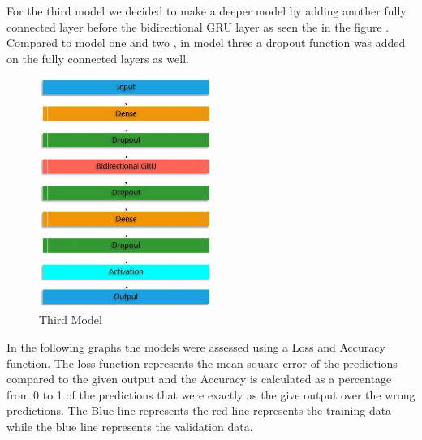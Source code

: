 For the third model we decided to make a deeper model by adding another fully connected layer before the bidirectional GRU layer as seen the in the figure . Compared to model one and two , in model three a dropout function was added on the fully connected layers as well.
\begin{figure}[htp]
	\centering
	\includegraphics[width=0.5\textwidth]{Illustrations/Model3.jpg}
	\caption{Third Model}
	\label{fig:thirdModel}
\end{figure}




In the following graphs the models were assessed using a Loss and Accuracy function. The loss function represents the mean square error of the predictions compared to the given output and the Accuracy is calculated as a percentage from 0 to 1 of the predictions that were exactly as the give output over the wrong predictions. The Blue line represents the red line represents the training data while the blue line represents the validation data.

